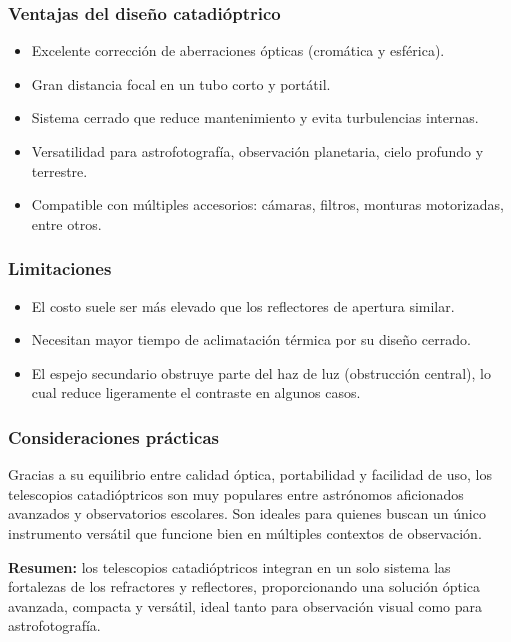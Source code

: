 \subsubsection*{Ventajas del diseño catadióptrico}

\begin{itemize}
	\item Excelente corrección de aberraciones ópticas (cromática y esférica).
	\item Gran distancia focal en un tubo corto y portátil.
	\item Sistema cerrado que reduce mantenimiento y evita turbulencias internas.
	\item Versatilidad para astrofotografía, observación planetaria, cielo profundo y terrestre.
	\item Compatible con múltiples accesorios: cámaras, filtros, monturas motorizadas, entre otros.
\end{itemize}

\subsubsection*{Limitaciones}

\begin{itemize}
	\item El costo suele ser más elevado que los reflectores de apertura similar.
	\item Necesitan mayor tiempo de aclimatación térmica por su diseño cerrado.
	\item El espejo secundario obstruye parte del haz de luz (obstrucción central), lo cual reduce ligeramente el contraste en algunos casos.
\end{itemize}

\subsubsection*{Consideraciones prácticas}

Gracias a su equilibrio entre calidad óptica, portabilidad y facilidad de uso, los telescopios catadióptricos son muy populares entre astrónomos aficionados avanzados y observatorios escolares. Son ideales para quienes buscan un único instrumento versátil que funcione bien en múltiples contextos de observación.

\textbf{Resumen:} los telescopios catadióptricos integran en un solo sistema las fortalezas de los refractores y reflectores, proporcionando una solución óptica avanzada, compacta y versátil, ideal tanto para observación visual como para astrofotografía.



